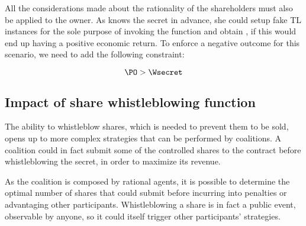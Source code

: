 All the considerations made about the rationality of the shareholders must also be applied to the owner.
As \owner knows the secret in advance, she could setup fake TL instances for the sole purpose of invoking the \texttt{\algowhistleblowsecret} function and obtain \Wsecret, if this would end up having a positive economic return.
%
To enforce a negative outcome for this scenario, we need to add the following constraint:

\begin{equation}\label{eqbalance3}
\PO > \Wsecret
\end{equation}





\subsection{Impact of share whistleblowing function}\label{sect:impact_wh}

The ability to whistleblow shares, which is needed to prevent them to be sold, opens up to more complex strategies that can be performed by coalitions.
A coalition \coalition
could in fact submit some of the controlled shares to the contract before whistleblowing the secret, in order to maximize its revenue.

As the coalition is composed by rational agents, it is possible to determine the optimal number \jopt of shares that \coalition could submit before incurring into penalties or advantaging other participants.
Whistleblowing a share is in fact a public event, observable by anyone, so it could itself trigger other participants' strategies.


